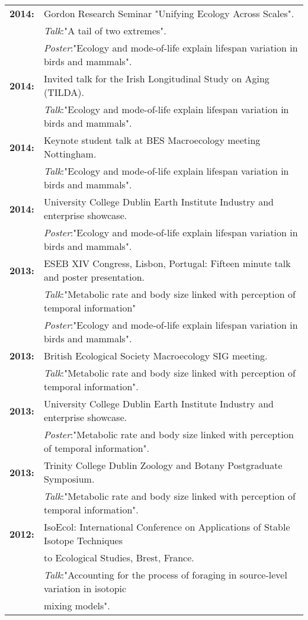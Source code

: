 \documentclass[10pt,a4paper]{article}
\begin{document}
\raggedright
\begin{tabular}{ll}
\textbf{2014:} & Gordon Research Seminar "Unifying Ecology Across Scales".\\ 
& \textsl{Talk}:"A tail of two extremes".\\
&\textsl{Poster}:"Ecology and mode-of-life explain lifespan variation in birds and mammals".\\
\textbf{2014:} & Invited talk for the Irish Longitudinal Study on Aging (TILDA).\\ 
& \textsl{Talk}:"Ecology and mode-of-life explain lifespan variation in birds and mammals".\\
\textbf{2014:} & Keynote student talk at BES Macroecology meeting Nottingham.\\ 
& \textsl{Talk}:"Ecology and mode-of-life explain lifespan variation in birds and mammals".\\
\textbf{2014:} & University College Dublin Earth Institute Industry and enterprise showcase.\\
&\textsl{Poster}:"Ecology and mode-of-life explain lifespan variation in birds and mammals".\\
\textbf{2013:} & ESEB XIV Congress, Lisbon, Portugal: Fifteen minute talk and poster presentation.\\
&\textsl{Talk}:"Metabolic rate and body size linked with perception of temporal information"\\
& \textsl{Poster}:"Ecology and mode-of-life explain lifespan variation in birds and mammals".\\
\textbf{2013:} & British Ecological Society Macroecology SIG meeting.\\
&\textsl{Talk}:"Metabolic rate and body size linked with perception of temporal information".\\
\textbf{2013:} & University College Dublin Earth Institute Industry and enterprise showcase.\\
&\textsl{Poster}:"Metabolic rate and body size linked with perception of temporal information".\\
\textbf{2013:} & Trinity College Dublin Zoology and Botany Postgraduate Symposium.\\
&\textsl{Talk}:"Metabolic rate and body size linked with perception of temporal information".\\
\textbf{2012:} & IsoEcol: International Conference on Applications of Stable Isotope Techniques\\
&to Ecological Studies, Brest, France.\\
 &\textsl{Talk}:"Accounting for the process of foraging in source-level variation in isotopic\\
& mixing models".\\


\end{tabular}
\bigskip
\end{document}
